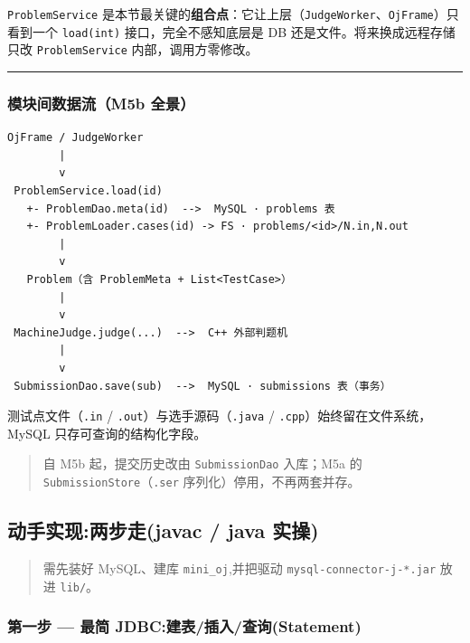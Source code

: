 \documentclass[
  11pt,
]{ctexart}
\begin{document}
\texttt{ProblemService}
是本节最关键的\textbf{组合点}：它让上层（\texttt{JudgeWorker}、\texttt{OjFrame}）只看到一个
\texttt{load(int)} 接口，完全不感知底层是 DB
还是文件。将来换成远程存储只改 \texttt{ProblemService}
内部，调用方零修改。

\begin{center}\rule{0.5\linewidth}{0.5pt}\end{center}

\hypertarget{ux6a21ux5757ux95f4ux6570ux636eux6d41m5b-ux5168ux666f}{%
\subsubsection{模块间数据流（M5b
全景）}\label{ux6a21ux5757ux95f4ux6570ux636eux6d41m5b-ux5168ux666f}}

\begin{verbatim}
OjFrame / JudgeWorker
        |
        v
 ProblemService.load(id)
   +- ProblemDao.meta(id)  -->  MySQL · problems 表
   +- ProblemLoader.cases(id) -> FS · problems/<id>/N.in,N.out
        |
        v
   Problem（含 ProblemMeta + List<TestCase>）
        |
        v
 MachineJudge.judge(...)  -->  C++ 外部判题机
        |
        v
 SubmissionDao.save(sub)  -->  MySQL · submissions 表（事务）
\end{verbatim}

测试点文件（\texttt{.in} / \texttt{.out}）与选手源码（\texttt{.java} /
\texttt{.cpp}）始终留在文件系统，MySQL 只存可查询的结构化字段。

\begin{quote}
自 M5b 起，提交历史改由 \texttt{SubmissionDao} 入库；M5a 的
\texttt{SubmissionStore}（\texttt{.ser} 序列化）停用，不再两套并存。
\end{quote}

\hypertarget{ux52a8ux624bux5b9eux73b0ux4e24ux6b65ux8d70javac-java-ux5b9eux64cd-4}{%
\subsection{动手实现:两步走(javac / java
实操)}\label{ux52a8ux624bux5b9eux73b0ux4e24ux6b65ux8d70javac-java-ux5b9eux64cd-4}}

\begin{quote}
需先装好 MySQL、建库 \texttt{mini\_oj},并把驱动
\texttt{mysql-connector-j-*.jar} 放进 \texttt{lib/}。
\end{quote}

\hypertarget{ux7b2cux4e00ux6b65-ux6700ux7b80-jdbcux5efaux8868ux63d2ux5165ux67e5ux8be2statement}{%
\subsubsection{\texorpdfstring{第一步 \KS --- 最简
JDBC:建表/插入/查询(Statement)}{第一步 --- 最简 JDBC:建表/插入/查询(Statement)}}\label{ux7b2cux4e00ux6b65-ux6700ux7b80-jdbcux5efaux8868ux63d2ux5165ux67e5ux8be2statement}}
\end{document}
